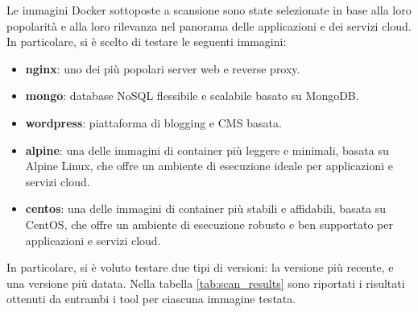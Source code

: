 Le immagini Docker sottoposte a scansione sono state selezionate in base alla loro popolarità e alla loro rilevanza nel panorama delle applicazioni e dei servizi cloud. In particolare, si è scelto di testare le seguenti immagini:
\begin{itemize}
   \item \textbf{nginx}: uno dei più popolari server web e reverse proxy.
   \item \textbf{mongo}: database NoSQL flessibile e scalabile basato su MongoDB.
   \item \textbf{wordpress}: piattaforma di blogging e CMS basata.
   \item \textbf{alpine}: una delle immagini di container più leggere e minimali, basata su Alpine Linux, che offre un ambiente di esecuzione ideale per applicazioni e servizi cloud.
   \item \textbf{centos}: una delle immagini di container più stabili e affidabili, basata su CentOS, che offre un ambiente di esecuzione robusto e ben supportato per applicazioni e servizi cloud.
\end{itemize}
In particolare, si è voluto testare due tipi di versioni: la versione più recente, e una versione più datata. Nella tabella \ref{tab:scan_results} sono riportati i risultati ottenuti da entrambi i tool per ciascuna immagine testata.
